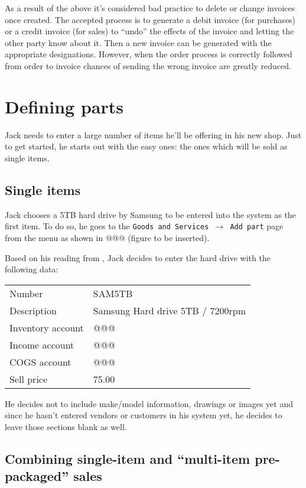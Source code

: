 As a result of the above it's considered bad practice to delete or change invoices once
created. The accepted process is to generate a debit invoice (for purchases) or a credit
invoice (for sales) to ``undo'' the effects of the invoice and letting the other party
know about it. Then a new invoice can be generated with the appropriate designations. However,
when the order process is correctly followed from order to invoice chances of sending the wrong
invoice are greatly reduced.

\section{Defining parts}

Jack needs to enter a large number of items he'll be offering in his new shop. Just to
get started, he starts out with the easy ones: the ones which will be sold as single items.

\subsection{Single items}

Jack chooses a 5TB hard drive by Samsung to be entered into the system as the first item.
To do so, he goes to the {\tt Goods and Services $\rightarrow$ Add part} page from the menu
as shown in @@@ (figure to be inserted).

Based on his reading from , Jack decides to enter the hard
drive with the following data:

\begin{tabular}{ll}
Number & SAM5TB \\
Description & Samsung Hard drive 5TB / 7200rpm \\
Inventory account & @@@ \\
Income account & @@@ \\
COGS account & @@@ \\
Sell price & 75.00
\end{tabular}

He decides not to include make/model information, drawings or images yet and since
he hasn't entered vendors or customers in his system yet, he decides to leave
those sections blank as well.

\subsection{Combining single-item and ``multi-item pre-packaged'' sales}

